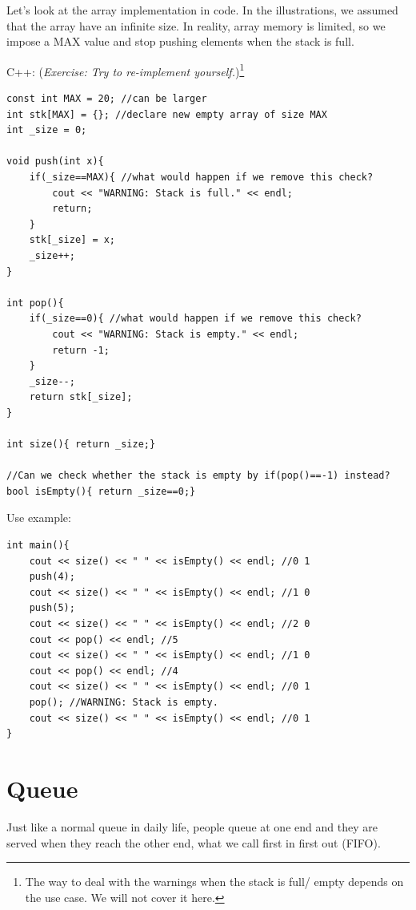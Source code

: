 Let's look at the array implementation in code. In the illustrations, we assumed that the array have an infinite size. In reality, array memory is limited, so we impose a MAX value and stop pushing elements when the stack is full.
\vspace{6mm}

C++: (\textit{Exercise: Try to re-implement yourself.})\footnote{The way to deal with the warnings when the stack is full/ empty depends on the use case. We will not cover it here.}
\begin{lstlisting}
const int MAX = 20; //can be larger
int stk[MAX] = {}; //declare new empty array of size MAX
int _size = 0;

void push(int x){
    if(_size==MAX){ //what would happen if we remove this check?
        cout << "WARNING: Stack is full." << endl;
        return;
    }
    stk[_size] = x;
    _size++;
}

int pop(){
    if(_size==0){ //what would happen if we remove this check?
        cout << "WARNING: Stack is empty." << endl;
        return -1;
    }
    _size--;
    return stk[_size];
}

int size(){ return _size;}

//Can we check whether the stack is empty by if(pop()==-1) instead?
bool isEmpty(){ return _size==0;}
\end{lstlisting}

Use example:
\begin{lstlisting}
int main(){
    cout << size() << " " << isEmpty() << endl; //0 1
    push(4);
    cout << size() << " " << isEmpty() << endl; //1 0
    push(5);
    cout << size() << " " << isEmpty() << endl; //2 0
    cout << pop() << endl; //5
    cout << size() << " " << isEmpty() << endl; //1 0
    cout << pop() << endl; //4
    cout << size() << " " << isEmpty() << endl; //0 1
    pop(); //WARNING: Stack is empty.
    cout << size() << " " << isEmpty() << endl; //0 1
} 
\end{lstlisting}
\section{Queue}
Just like a normal queue in daily life, people queue at one end and they are served when they reach the other end, what we call first in first out (FIFO).


